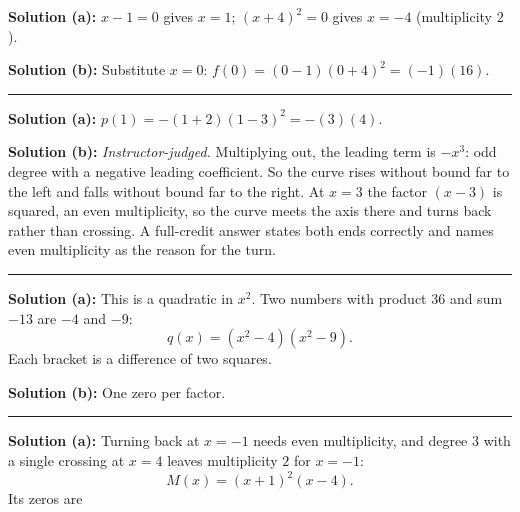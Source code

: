 \documentclass[12pt]{article}
\begin{document}
\textbf{Solution (a):} $x - 1 = 0$ gives $x = 1$; $(x+4)^2 = 0$ gives $x = -4$
(multiplicity $2$). 

\textbf{Solution (b):} Substitute $x = 0$: $f(0) = (0-1)(0+4)^2 = (-1)(16)$.

\vspace{0.25cm}\noindent\rule{\linewidth}{0.2pt}\vspace{0.25cm}


\textbf{Solution (a):} $p(1) = -(1+2)(1-3)^2 = -(3)(4)$. 

\textbf{Solution (b):} \emph{Instructor-judged.} Multiplying out, the leading term
is $-x^3$: odd degree with a negative leading coefficient. So the curve rises
without bound far to the left and falls without bound far to the right. At
$x = 3$ the factor $(x-3)$ is squared, an even multiplicity, so the curve meets
the axis there and turns back rather than crossing. A full-credit answer states
both ends correctly and names even multiplicity as the reason for the turn.

\vspace{0.25cm}\noindent\rule{\linewidth}{0.2pt}\vspace{0.25cm}


\textbf{Solution (a):} This is a quadratic in $x^2$. Two numbers with product $36$
and sum $-13$ are $-4$ and $-9$:
\[ q(x) = \left(x^2 - 4\right)\left(x^2 - 9\right). \]
Each bracket is a difference of two squares.

\textbf{Solution (b):} One zero per factor.

\vspace{0.25cm}\noindent\rule{\linewidth}{0.2pt}\vspace{0.25cm}


\textbf{Solution (a):} Turning back at $x = -1$ needs even multiplicity, and
degree $3$ with a single crossing at $x = 4$ leaves multiplicity $2$ for $x = -1$:
\[ M(x) = (x+1)^2(x-4). \]
Its zeros are 
\end{document}
